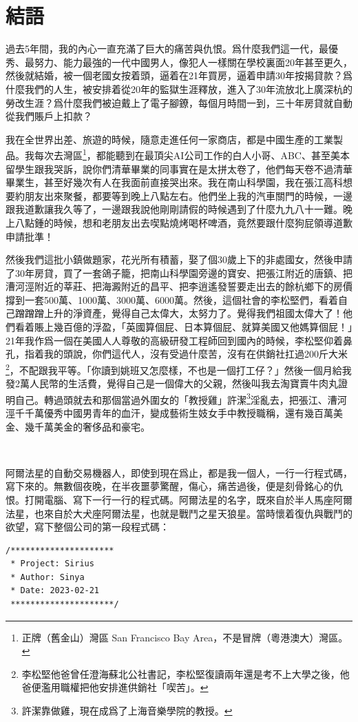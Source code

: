 \chapter{結語}

過去5年間，我的內心一直充滿了巨大的痛苦與仇恨。爲什麼我們這一代，最優秀、最努力、能力最強的一代中國男人，像犯人一樣關在學校裏面20年甚至更久，然後就結婚，被一個老國女按着頭，逼着在21年買房，逼着申請30年按揭貸款？爲什麼我們的人生，被安排着從20年的監獄生涯釋放，進入了30年流放北上廣深杭的勞改生涯？爲什麼我們被迫戴上了電子腳鐐，每個月時間一到，三十年房貸就自動從我們賬戶上扣款？

我在全世界出差、旅遊的時候，隨意走進任何一家商店，都是中國生產的工業製品。我每次去灣區\footnote{正牌（舊金山）灣區 San Francisco Bay Area，不是冒牌（粵港澳大）灣區。}，都能聽到在最頂尖AI公司工作的白人小哥、ABC、甚至美本留學生跟我哭訴，說你們清華畢業的同事實在是太拼太卷了，他們每天卷不過清華畢業生，甚至好幾次有人在我面前直接哭出來。我在南山科學園，我在張江高科想要約朋友出來聚餐，都要等到晚上八點左右。他們坐上我的汽車關門的時候，一邊跟我道歉讓我久等了，一邊跟我說他剛剛請假的時候遇到了什麼九九八十一難。晚上八點鍾的時候，想和老朋友出去喫點燒烤喝杯啤酒，竟然要跟什麼狗屁領導道歉申請批準！

然後我們這批小鎮做題家，花光所有積蓄，娶了個30歲上下的非處國女，然後申請了30年房貸，買了一套鴿子籠，把南山科學園旁邊的寶安、把張江附近的唐鎮、把漕河涇附近的莘莊、把海澱附近的昌平、把李逍遙發誓要走出去的餘杭鄉下的房價撐到一套500萬、1000萬、3000萬、6000萬。然後，這個社會的李松堅們，看着自己蹭蹭蹭上升的淨資產，覺得自己太偉大，太努力了。覺得我們祖國太偉大了！他們看着賬上幾百億的浮盈，「英國算個屁、日本算個屁、就算美國又他媽算個屁！」21年我作爲一個在美國人人尊敬的高級研發工程師回到國內的時候，李松堅仰着鼻孔，指着我的頭說，你們這代人，沒有受過什麼苦，沒有在供銷社扛過200斤大米\footnote{李松堅他爸曾任澄海蘇北公社書記，李松堅復讀兩年還是考不上大學之後，他爸便濫用職權把他安排進供銷社「喫苦」。}，不配跟我平等。「你讀到姚班又怎麼樣，不也是一個打工仔？」然後一個月給我發2萬人民幣的生活費，覺得自己是一個偉大的父親，然後叫我去淘寶賣牛肉丸證明自己。轉過頭就去和那個當過外圍女的「教授雞」許潔\footnote{許潔靠做雞，現在成爲了上海音樂學院的教授。}淫亂去，把張江、漕河涇千千萬優秀中國男青年的血汗，變成藝術生妓女手中教授職稱，還有幾百萬美金、幾千萬美金的奢侈品和豪宅。

\ 

阿爾法星的自動交易機器人，即使到現在爲止，都是我一個人，一行一行程式碼，寫下來的。無數個夜晚，在半夜噩夢驚醒，傷心，痛苦過後，便是刻骨銘心的仇恨。打開電腦、寫下一行一行的程式碼。阿爾法星的名字，既來自於半人馬座阿爾法星，也來自於大犬座阿爾法星，也就是戰鬥之星天狼星。當時懷着復仇與戰鬥的欲望，寫下整個公司的第一段程式碼：\begin{verbatim}
/*********************
 * Project: Sirius
 * Author: Sinya
 * Date: 2023-02-21
 *********************/
\end{verbatim}

